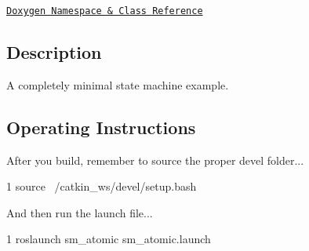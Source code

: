 \href{https://reelrbtx.github.io/SMACC/master/html/namespacesm__atomic.html}{\tt Doxygen Namespace \& Class Reference}

\subsection*{Description}

A completely minimal state machine example. \subsection*{Operating Instructions}

After you build, remember to source the proper devel folder...


\begin{DoxyCode}
1 source ~/catkin\_ws/devel/setup.bash
\end{DoxyCode}


And then run the launch file...


\begin{DoxyCode}
1 roslaunch sm\_atomic sm\_atomic.launch
\end{DoxyCode}
 